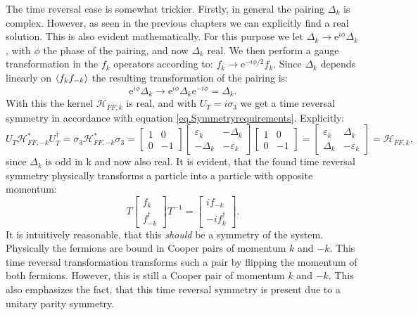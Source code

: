 The time reversal case is somewhat trickier. Firstly, in general the pairing $\Delta_k$ is complex. However, as seen in the previous chapters we can explicitly find a real solution. This is also evident mathematically. For this purpose we let $\Delta_k \to \text{e}^{i\phi}\Delta_k$, with $\phi$ the phase of the pairing, and now $\Delta_k$ real. We then perform a gauge transformation in the $f_k$ operators according to: $f_k \to \text{e}^{-i\phi/2} f_k$. Since $\Delta_k$ depends linearly on $\braket{f_kf_{-k}}$ the resulting transformation of the pairing is:
\begin{equation}
\text{e}^{i\phi}\Delta_k \to \text{e}^{i\phi}\Delta_k\text{e}^{-i\phi} = \Delta_k. \nonumber
\end{equation}
With this the kernel $\mathcal{H}_{FF,k}$ is real, and with $U_T = i\sigma_3$ we get a time reversal symmetry in accordance with equation \ref{eq.Symmetryrequirements}. Explicitly:
\begin{equation}
U_T\mathcal{H}^*_{FF,-k}U^\dagger_T = \sigma_3\mathcal{H}^*_{FF,-k}\sigma_3 = \begin{bmatrix} 1 & 0 \\ 0 & -1 \end{bmatrix}\begin{bmatrix} \varepsilon_k & -\Delta_k \\ -\Delta_k & -\varepsilon_k \end{bmatrix} \begin{bmatrix} 1 & 0 \\ 0 & -1 \end{bmatrix} = \begin{bmatrix} \varepsilon_k & \Delta_k \\ \Delta_k & -\varepsilon_k \end{bmatrix} = \mathcal{H}_{FF,k}, \nonumber
\end{equation}
since $\Delta_k$ is odd in k and now also real. It is evident, that the found time reversal symmetry physically transforms a particle into a particle with opposite momentum:
\begin{equation}
T \begin{bmatrix} f_k \\ f^\dagger_{-k} \end{bmatrix} T^{-1} = \begin{bmatrix} i f_{-k} \\ - i f^\dagger_{k} \end{bmatrix}. \nonumber
\end{equation}
It is intuitively reasonable, that this \textit{should} be a symmetry of the system. Physically the fermions are bound in Cooper pairs of momentum $k$ and $-k$. This time reversal transformation transforms such a pair by flipping the momentum of both fermions. However, this is still a Cooper pair of momentum $k$ and $-k$. This also emphasizes the fact, that this time reversal symmetry is present due to a unitary parity symmetry. 

